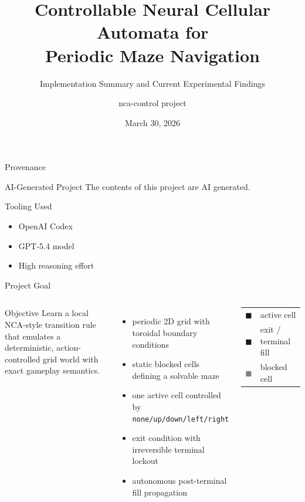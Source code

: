 \documentclass[aspectratio=169,11pt]{beamer}
\title[Controllable NCA for Maze Navigation]{Controllable Neural Cellular Automata for\\Periodic Maze Navigation}
\subtitle[Project Summary]{Implementation Summary and Current Experimental Findings}
\author[nca-control]{nca-control project}
\date{March 30, 2026}
\begin{document}
\begin{frame}
  \titlepage
\end{frame}

\begin{frame}{Provenance}
\begin{block}{AI-Generated Project}
The contents of this project are AI generated.
\end{block}

\begin{block}{Tooling Used}
\begin{itemize}
  \item OpenAI Codex
  \item GPT-5.4 model
  \item High reasoning effort
\end{itemize}
\end{block}
\end{frame}

\begin{frame}{Project Goal}
\begin{columns}[T,totalwidth=\textwidth]
\begin{block}{Objective}
Learn a local NCA-style transition rule that emulates a deterministic, action-controlled grid world with exact gameplay semantics.
\end{block}
\vspace{0.4em}
\begin{itemize}
  \item periodic 2D grid with toroidal boundary conditions
  \item static blocked cells defining a solvable maze
  \item one active cell controlled by \texttt{none/up/down/left/right}
  \item exit condition with irreversible terminal lockout
  \item autonomous post-terminal fill propagation
\end{itemize}

\centering
{}

\vspace{0.3em}
\begin{tabular}{@{}ll@{}}
\textcolor{accentgreen}{$\blacksquare$} & active cell \\
\textcolor{accentorange}{$\blacksquare$} & exit / terminal fill \\
\textcolor{gray}{$\blacksquare$} & blocked cell \\
\end{tabular}
\end{columns}
\end{frame}
\end{document}
